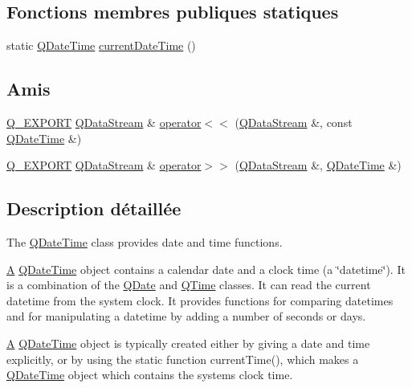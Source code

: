 \subsection*{Fonctions membres publiques statiques}
\begin{DoxyCompactItemize}
\item 
static \hyperlink{class_q_date_time}{Q\+Date\+Time} \hyperlink{class_q_date_time_a1e8e27c71617d5c97abe80ee2426a1b4}{current\+Date\+Time} ()
\end{DoxyCompactItemize}
\subsection*{Amis}
\begin{DoxyCompactItemize}
\item 
\hyperlink{qglobal_8h_a7323ea4c33b4021dee51e9b1f773538d}{Q\+\_\+\+E\+X\+P\+O\+R\+T} \hyperlink{class_q_data_stream}{Q\+Data\+Stream} \& \hyperlink{class_q_date_time_ac4f6ae497406f297a47183ecc265816a}{operator$<$$<$} (\hyperlink{class_q_data_stream}{Q\+Data\+Stream} \&, const \hyperlink{class_q_date_time}{Q\+Date\+Time} \&)
\item 
\hyperlink{qglobal_8h_a7323ea4c33b4021dee51e9b1f773538d}{Q\+\_\+\+E\+X\+P\+O\+R\+T} \hyperlink{class_q_data_stream}{Q\+Data\+Stream} \& \hyperlink{class_q_date_time_afb6acd9837e7b1d8fc54e6665a9adc29}{operator$>$$>$} (\hyperlink{class_q_data_stream}{Q\+Data\+Stream} \&, \hyperlink{class_q_date_time}{Q\+Date\+Time} \&)
\end{DoxyCompactItemize}


\subsection{Description détaillée}
The \hyperlink{class_q_date_time}{Q\+Date\+Time} class provides date and time functions. 

\hyperlink{class_a}{A} \hyperlink{class_q_date_time}{Q\+Date\+Time} object contains a calendar date and a clock time (a \char`\"{}datetime\char`\"{}). It is a combination of the \hyperlink{class_q_date}{Q\+Date} and \hyperlink{class_q_time}{Q\+Time} classes. It can read the current datetime from the system clock. It provides functions for comparing datetimes and for manipulating a datetime by adding a number of seconds or days.

\hyperlink{class_a}{A} \hyperlink{class_q_date_time}{Q\+Date\+Time} object is typically created either by giving a date and time explicitly, or by using the static function current\+Time(), which makes a \hyperlink{class_q_date_time}{Q\+Date\+Time} object which contains the system\textquotesingle{}s clock time.

